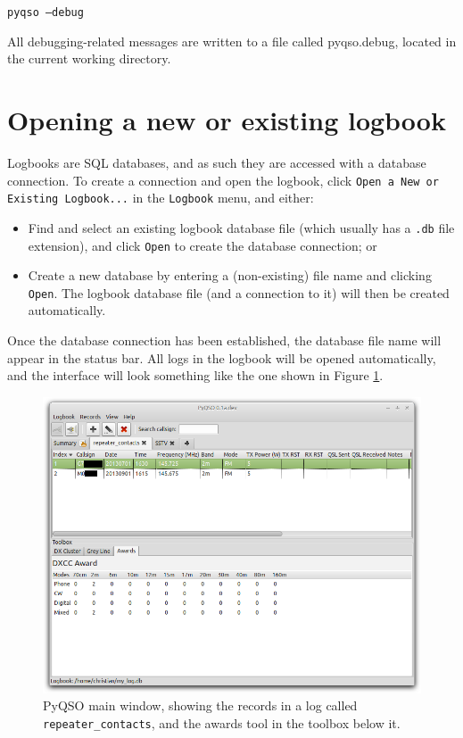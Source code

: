 \documentclass[11pt, a4paper]{report}
\begin{document}
  \texttt{pyqso --debug}

\noindent All debugging-related messages are written to a file called pyqso.debug, located in the current working directory.

\section{Opening a new or existing logbook}
Logbooks are SQL databases, and as such they are accessed with a database connection. To create a connection and open the logbook, click \texttt{Open a New or Existing Logbook...} in the \texttt{Logbook} menu, and either:
\begin{itemize}
  \item Find and select an existing logbook database file (which usually has a \texttt{.db} file extension), and click \texttt{Open} to create the database connection; or
  \item Create a new database by entering a (non-existing) file name and clicking \texttt{Open}. The logbook database file (and a connection to it) will then be created automatically.
\end{itemize}
Once the database connection has been established, the database file name will appear in the status bar. All logs in the logbook will be opened automatically, and the interface will look something like the one shown in Figure \ref{fig:log_view_with_awards}.

\begin{figure}
  \centering
  \includegraphics[width=1\columnwidth]{images/log_with_awards.png}
  \caption{PyQSO main window, showing the records in a log called \texttt{repeater\_contacts}, and the awards tool in the toolbox below it.}
  \label{fig:log_view_with_awards}
\end{figure}
\end{document}
